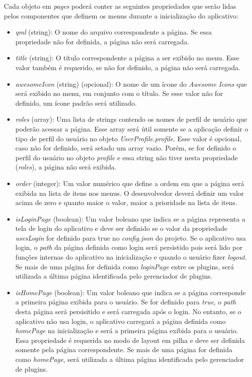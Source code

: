 Cada objeto em \textit{pages} poderá conter as seguintes propriedades que serão lidas pelos componentes que definem os menus durante a inicialização do aplicativo:

\begin{itemize}
	\item \textit{qml} (string): O nome do arquivo correspondente a página. Se essa propriedade não for definida, a página não será carregada.

	\item \textit{title} (string): O título correspondente a página a ser exibido no menu. Esse valor também é requerido, se não for definido, a página não será carregada.

	\item \textit{awesomeIcon} (string) (opcional): O nome de um ícone do \textit{Awesome Icons} que será exibido no menu, em conjunto com o título. Se esse valor não for definido, um ícone padrão será utilizado.

	\item \textit{roles} (array): Uma lista de strings contendo os nomes de perfil de usuário que poderão acessar a página. Esse array será útil somente se a aplicação definir o tipo de perfil do usuário no objeto \textit{UserProfile.profile}. Esse valor é opcional, caso não for definido, será setado um array vazio. Porém, se for definido o perfil do usuário no objeto \textit{profile} e essa string não tiver nesta propriedade (\textit{roles}), a página não será exibida.

	\item \textit{order} (integer): Um valor numérico que define a ordem em que a página será exibida na lista de itens nos menus. O desenvolvedor deverá definir um valor acima de zero e quanto maior o valor, maior a prioridade na lista de itens.

	\item \textit{isLoginPage} (boolean): Um valor boleano que indica se a página representa a tela de login do aplicativo e deve ser definido se o valor da propriedade \textit{usesLogin} for definido para true no \textit{config.json} do projeto. Se o aplicativo usa login, o \textit{path} da página definida como login será persistido pois será lido por funções internas do aplicativo na inicialização e quando o usuário fizer \textit{logout}. Se mais de uma página for definida como \textit{loginPage} entre os plugins, será utilizada a última página identificada pelo gerenciador de plugins.

	\item \textit{isHomePage} (boolean): Um valor boleano que indica se a página corresponde a primeira página exibida para o usuário. Se for definido para \textit{true}, o \textit{path} desta página será persisitido e será carregada após o login. No entanto, se o aplicativo não usa login, o aplicativo carregará a página definida como \textit{homePage} na inicialização e será a primeira página exibida para o usuário. Essa propriedade é requerida no modo de layout em pilha e deve ser definida somente pela página correspondente. Se mais de uma página for definida como \textit{homePage}, será utilizada a última página identificada pelo gerenciador de plugins.


\end{itemize}
